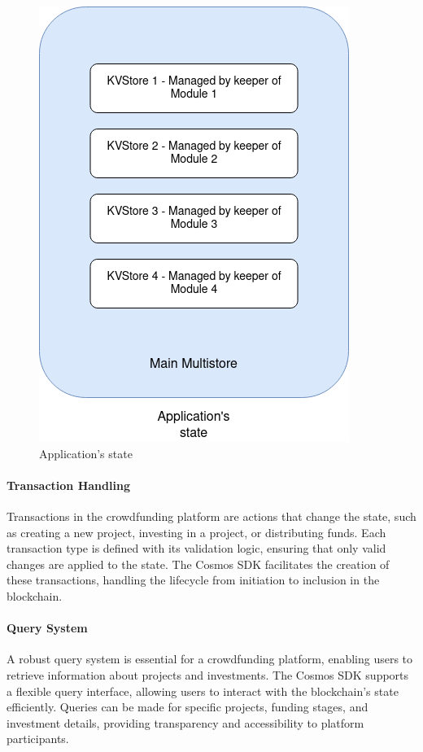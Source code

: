 \begin{figure}[H]
    \centering
    \includegraphics[scale=0.45]{figures/multistore.png}
    \caption{Application's state}
    \label{fig:application-multistore}
\end{figure}

\paragraph{Transaction Handling}

Transactions in the crowdfunding platform are actions that change the state, such as creating a new project, investing in a project, or distributing funds. Each transaction type is defined with its validation logic, ensuring that only valid changes are applied to the state. The Cosmos SDK facilitates the creation of these transactions, handling the lifecycle from initiation to inclusion in the blockchain.

\paragraph{Query System}

A robust query system is essential for a crowdfunding platform, enabling users to retrieve information about projects and investments. The Cosmos SDK supports a flexible query interface, allowing users to interact with the blockchain's state efficiently. Queries can be made for specific projects, funding stages, and investment details, providing transparency and accessibility to platform participants.

